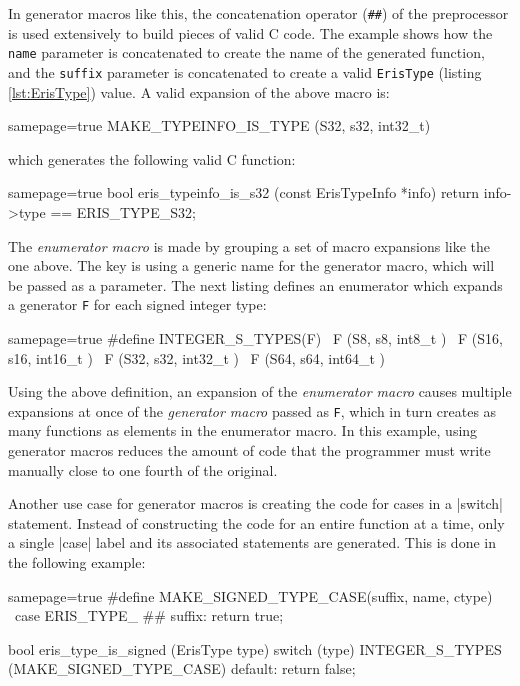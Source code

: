 \noindent In generator macros like this, the concatenation operator
(\verb|##|) of the preprocessor is used extensively to build pieces of valid
C code. The example shows how the \verb|name| parameter is concatenated to
create the name of the generated function, and the \verb|suffix| parameter is
concatenated to create a valid \verb|ErisType| (listing \vref{lst:ErisType})
value. A valid expansion of the above macro is:

\begin{ccode*}{samepage=true}
MAKE_TYPEINFO_IS_TYPE (S32, s32, int32_t)
\end{ccode*}

\noindent
which generates the following valid C function:

\begin{ccode*}{samepage=true}
  bool eris_typeinfo_is_s32 (const ErisTypeInfo *info)
  { return info->type == ERIS_TYPE_S32; }
\end{ccode*}

\noindent The \emph{enumerator macro} is made by grouping a set of macro
expansions like the one above. The key is using a generic name for the
generator macro, which will be passed as a parameter. The next listing defines
an enumerator which expands a generator \verb|F| for each signed integer type:

\begin{ccode*}{samepage=true}
#define INTEGER_S_TYPES(F) \
    F (S8,  s8,  int8_t  ) \
    F (S16, s16, int16_t ) \
    F (S32, s32, int32_t ) \
    F (S64, s64, int64_t )
\end{ccode*}

\noindent Using the above definition, an expansion of the \emph{enumerator
macro} causes multiple expansions at once of the \emph{generator macro} passed
as \verb|F|, which in turn creates as many functions as elements in the
enumerator macro. In this example, using generator macros reduces the amount
of code that the programmer must write manually close to one fourth of the
original.

Another use case for generator macros is creating the code for cases in
a \Mc|switch| statement. Instead of constructing the code for an entire
function at a time, only a single \Mc|case| label and its associated
statements are generated. This is done in the following example:

\begin{ccode*}{samepage=true}
#define MAKE_SIGNED_TYPE_CASE(suffix, name, ctype) \
    case ERIS_TYPE_ ## suffix: return true;

bool eris_type_is_signed (ErisType type) {
  switch (type) {
    INTEGER_S_TYPES (MAKE_SIGNED_TYPE_CASE)
    default: return false;
  }
}
\end{ccode*}


